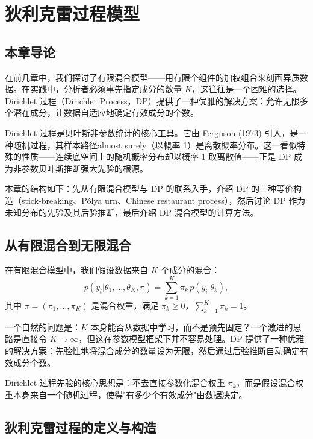 
\chapter{狄利克雷过程模型}

\section{本章导论}

在前几章中，我们探讨了有限混合模型——用有限个组件的加权组合来刻画异质数据。在实践中，分析者必须事先指定成分的数量 $K$，这往往是一个困难的选择。Dirichlet 过程（Dirichlet Process，DP）提供了一种优雅的解决方案：允许无限多个潜在成分，让数据自适应地确定有效成分的个数。

Dirichlet 过程是贝叶斯非参数统计的核心工具。它由 Ferguson (1973) 引入，是一种随机过程，其样本路径almost surely（以概率 1）是离散概率分布。这一看似特殊的性质——连续底空间上的随机概率分布却以概率 1 取离散值——正是 DP 成为非参数贝叶斯推断强大先验的根源。

本章的结构如下：先从有限混合模型与 DP 的联系入手，介绍 DP 的三种等价构造（stick-breaking、Pólya urn、Chinese restaurant process），然后讨论 DP 作为未知分布的先验及其后验推断，最后介绍 DP 混合模型的计算方法。

\section{从有限混合到无限混合}

在有限混合模型中，我们假设数据来自 $K$ 个成分的混合：
\[
p(y_i | \theta_1, \ldots, \theta_K, \pi) = \sum_{k=1}^K \pi_k \, p(y_i | \theta_k),
\]
其中 $\pi = (\pi_1, \ldots, \pi_K)$ 是混合权重，满足 $\pi_k \ge 0$，$\sum_{k=1}^K \pi_k = 1$。

一个自然的问题是：$K$ 本身能否从数据中学习，而不是预先固定？一个激进的思路是直接令 $K \to \infty$，但这在参数模型框架下并不容易处理。DP 提供了一种优雅的解决方案：先验性地将混合成分的数量设为无限，然后通过后验推断自动确定有效成分个数。

Dirichlet 过程先验的核心思想是：不去直接参数化混合权重 $\pi_k$，而是假设混合权重本身来自一个随机过程，使得"有多少个有效成分"由数据决定。

\section{狄利克雷过程的定义与构造}

